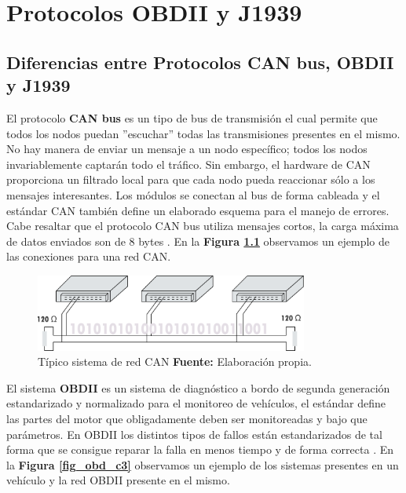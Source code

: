 \chapter[Capítulo 3. Protocolos OBDII y J1939]{Protocolos OBDII y J1939}

\section {Diferencias entre Protocolos CAN bus,  OBDII y J1939}

El protocolo {\bfseries CAN bus} es un tipo de bus de transmisión el cual permite que todos los nodos puedan ''escuchar'' todas las transmisiones presentes en el mismo. No hay manera de enviar un mensaje a un nodo específico; todos los nodos invariablemente captarán todo el tráfico. Sin embargo, el hardware de CAN proporciona un filtrado local para que cada nodo pueda reaccionar sólo a los mensajes interesantes. Los módulos se conectan al bus de forma cableada y el estándar CAN también define un elaborado esquema para el manejo de errores. Cabe resaltar que el protocolo CAN bus utiliza mensajes cortos, la carga máxima de datos enviados son de 8 bytes \cite{can_c3}. En la \textbf{Figura \ref{fig_can_c3}} observamos un ejemplo de las conexiones para una red CAN. 

\begin{figure}[H]
	\centering
	\includegraphics[width=0.8\textwidth]{./Cap3imagen/can.pdf}
	\caption [Típico sistema de red CAN.]{Típico sistema de red CAN\textbf{ Fuente:} %
		Elaboración propia.}
	\label{fig_can_c3} %
\end{figure}

El sistema {\bfseries OBDII} es un sistema de diagnóstico a bordo de segunda generación estandarizado y normalizado para el monitoreo de vehículos, el estándar define las partes del motor que obligadamente deben ser monitoreadas  y bajo que parámetros. En OBDII los distintos tipos de fallos están estandarizados de tal forma que se consigue reparar la falla en menos tiempo y de forma correcta \cite{obd_c3}. En la \textbf{Figura \ref{fig_obd_c3}} observamos un ejemplo de los sistemas presentes en un vehículo y la red OBDII presente en el mismo. 

